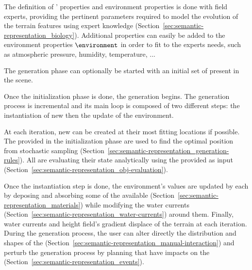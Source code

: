The definition of ' properties and environment properties is done with field experts, providing the pertinent parameters required to model the evolution of the terrain features using expert knowledge (Section~\ref{sec:semantic-representation_biology}). Additional properties can easily be added to the environment properties $\environment$ in order to fit to the experts needs, such as atmospheric pressure, humidity, temperature, ... 

The generation phase can optionally be started with an initial set of  present in the scene. 

Once the initialization phase is done, the generation begins. The generation process is incremental and its main loop is composed of two different steps: the instantiation of new  then the update of the environment.

At each iteration, new  can be created at their most fitting locations if possible. The  provided in the initialization phase are used to find the optimal position from stochastic sampling (Section~\ref{sec:semantic-representation_generation-rules}). 
All  are evaluating their state analytically using the  provided as input (Section~\ref{sec:semantic-representation_obj-evaluation}).

Once the instantiation step is done, the environment's values are updated by each  by deposing and absorbing some of the available  (Section~\ref{sec:semantic-representation_materials}) while modifying the water currents (Section~\ref{sec:semantic-representation_water-currents}) around them. Finally, water currents and height field's gradient displace  of the terrain at each iteration.
During the generation process, the user can alter directly the distribution and shapes of the  (Section~\ref{sec:semantic-representation_manual-interaction}) and perturb the generation process by planning  that have impacts on the  (Section~\ref{sec:semantic-representation_events}).

